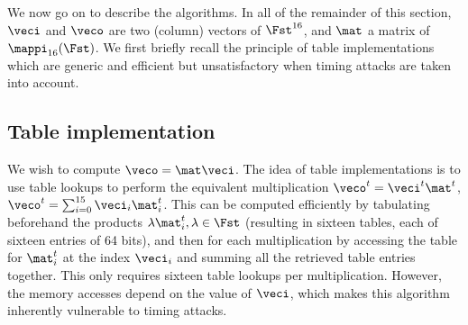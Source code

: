 \bigskip

We now go on to describe the algorithms.
In all of the remainder of this section, $\veci$ and $\veco$ are two (column) vectors of $\Fst^{16}$, and $\mat$ a matrix
of $\mappi_{16}(\Fst)$.
We first briefly recall the principle of table implementations which are generic and efficient but unsatisfactory when timing attacks are taken into account.

\subsection{Table implementation}



We wish to compute $\veco = \mat\veci$. The idea of table implementations is to use table lookups to perform the equivalent multiplication
$\veco^t = \veci^t\mat^t$, \ie $\veco^t = \sum_{i = 0}^{15} \veci_i\mat^t_i$.
This can be computed efficiently by tabulating beforehand the products $\lambda\mat^t_i, \lambda\in\Fst$ (resulting in
sixteen tables, each of sixteen entries of 64 bits), and then for each
multiplication by accessing the table for $\mat^t_i$ at the index $\veci_i$ and summing all the retrieved table entries together.
This only requires sixteen table lookups per multiplication. However, the memory accesses depend on the value of $\veci$,
which makes this algorithm inherently vulnerable to timing attacks.

